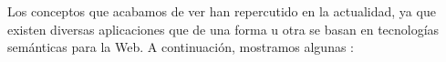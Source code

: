 %
%
%
%
%
%
%




Los conceptos que acabamos de ver han repercutido en la actualidad, ya que existen diversas aplicaciones que de una forma u otra se basan en tecnologías semánticas para la Web. A continuación, mostramos algunas \cite{cwb}:

